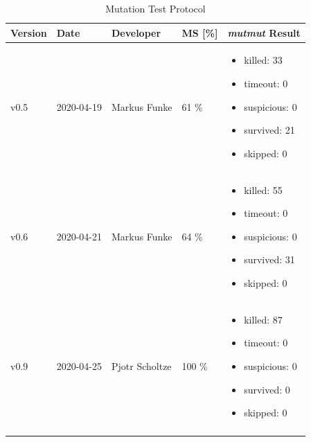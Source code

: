 \documentclass[a4paper]{article}
\begin{document}
\clearpage
\begin{longtable}[l]{ | m{50pt} | m{50pt} | m{80pt} | m{40pt} |  m{140pt} | }

    \rowcolor{vu-blue}
    \textcolor{vu-white}{\textbf{Version}} &
    \textcolor{vu-white}{\textbf{Date}} &
    \textcolor{vu-white}{\textbf{Developer}} &
    \textcolor{vu-white}{\textbf{MS [\%]}} &
    \textcolor{vu-white}{\textbf{\textit{mutmut} Result}} \\ \hline
    
    v0.5 &
    2020-04-19 &
    Markus Funke &
    61 \% &
    \begin{itemize}
        \item killed: 33
        \item timeout: 0
        \item suspicious: 0
        \item survived: 21
        \item skipped: 0
    \end{itemize} \\ \hline
    
    v0.6 &
    2020-04-21 &
    Markus Funke &
    64 \% &
    \begin{itemize}
        \item killed: 55
        \item timeout: 0
        \item suspicious: 0
        \item survived: 31
        \item skipped: 0
    \end{itemize} \\ \hline
    
    v0.9 &
    2020-04-25 &
    Pjotr Scholtze &
    100 \% &
    \begin{itemize}
        \item killed: 87
        \item timeout: 0
        \item suspicious: 0
        \item survived: 0
        \item skipped: 0
    \end{itemize} \\ \hline
    
    \caption{Mutation Test Protocol}
    \label{table:mutmut-protocol}
    \\

\end{longtable}
\end{document}
